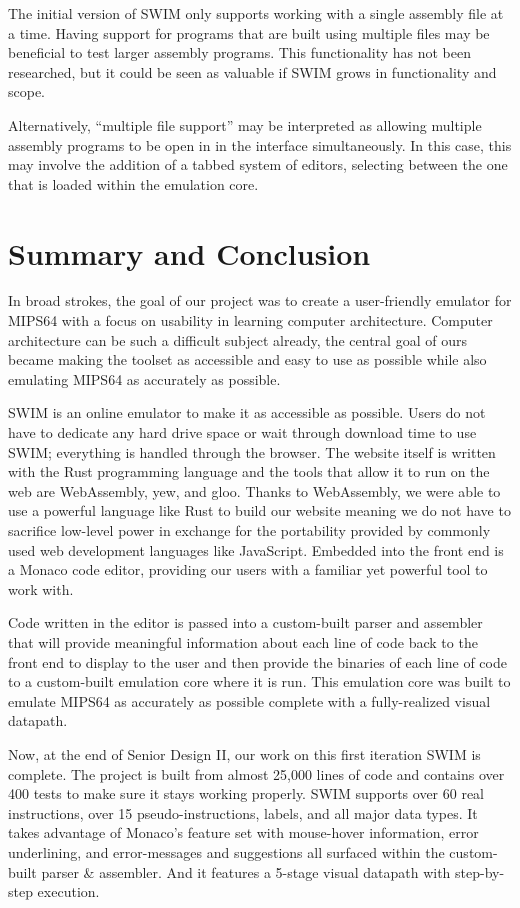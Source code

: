 \documentclass[
    paper=letter,
    parskip=half,
    fontsize=12pt,
    titlepage=firstiscover,
    toc=bibliography,
    numbers=endperiod
]{scrartcl}
\let\oldsection\section
\renewcommand{\section}{\newpage\oldsection}
\begin{document}
The initial version of SWIM only supports working with a single assembly
file at a time. Having support for programs that are built using
multiple files may be beneficial to test larger assembly programs. This
functionality has not been researched, but it could be seen as valuable
if SWIM grows in functionality and scope.

Alternatively, ``multiple file support'' may be interpreted as allowing
multiple assembly programs to be open in in the interface
simultaneously. In this case, this may involve the addition of a tabbed
system of editors, selecting between the one that is loaded within the
emulation core.

\section{Summary and Conclusion}

In broad strokes, the goal of our project was to create a user-friendly
emulator for MIPS64 with a focus on usability in learning computer
architecture. Computer architecture can be such a difficult subject
already, the central goal of ours became making the toolset as
accessible and easy to use as possible while also emulating MIPS64 as
accurately as possible.

SWIM is an online emulator to make it as accessible as possible. Users
do not have to dedicate any hard drive space or wait through download
time to use SWIM; everything is handled through the browser. The website
itself is written with the Rust programming language and the tools that
allow it to run on the web are WebAssembly, yew, and gloo. Thanks to
WebAssembly, we were able to use a powerful language like Rust to build
our website meaning we do not have to sacrifice low-level power in
exchange for the portability provided by commonly used web development
languages like JavaScript. Embedded into the front end is a Monaco code
editor, providing our users with a familiar yet powerful tool to work
with.

Code written in the editor is passed into a custom-built parser and
assembler that will provide meaningful information about each line of
code back to the front end to display to the user and then provide the
binaries of each line of code to a custom-built emulation core where it
is run. This emulation core was built to emulate MIPS64 as accurately as
possible complete with a fully-realized visual datapath.

Now, at the end of Senior Design II, our work on this first iteration
SWIM is complete. The project is built from almost 25,000 lines of code
and contains over 400 tests to make sure it stays working properly. SWIM
supports over 60 real instructions, over 15 pseudo-instructions, labels,
and all major data types. It takes advantage of Monaco's feature set
with mouse-hover information, error underlining, and error-messages and
suggestions all surfaced within the custom-built parser \& assembler.
And it features a 5-stage visual datapath with step-by-step execution.

\printbibliography
\end{document}
